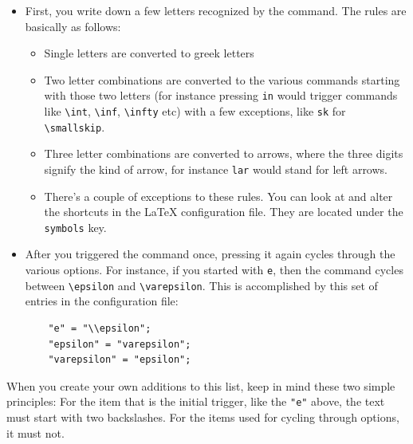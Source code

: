 \documentclass[11pt, x11names]{article}
\begin{document}
\begin{itemize}

    \item First, you write down a few letters recognized by the command. The rules are basically as follows:

    \begin{itemize}

        \item Single letters are converted to greek letters

        \item Two letter combinations are converted to the various commands starting with those two letters (for instance pressing \texttt{in} would trigger commands like \texttt{\textbackslash{}int}, \texttt{\textbackslash{}inf}, \texttt{\textbackslash{}infty} etc) with a few exceptions, like \texttt{sk} for \texttt{\textbackslash{}smallskip}.

        \item Three letter combinations are converted to arrows, where the three digits signify the kind of arrow, for instance \texttt{lar} would stand for left arrows.

        \item There's a couple of exceptions to these rules. You can look at and alter the shortcuts in the LaTeX configuration file. They are located under the \texttt{symbols} key.

    \end{itemize}

    \item After you triggered the command once, pressing it again cycles through the various options. For instance, if you started with \texttt{e}, then the command cycles between \texttt{\textbackslash{}epsilon} and \texttt{\textbackslash{}varepsilon}. This is accomplished by this set of entries in the configuration file:

    \begin{verbatim}
    "e" = "\\epsilon";
    "epsilon" = "varepsilon";
    "varepsilon" = "epsilon";
    \end{verbatim}
\end{itemize}

When you create your own additions to this list, keep in mind these two simple principles: For the item that is the initial trigger, like the \texttt{"e"} above, the text must start with two backslashes. For the items used for cycling through options, it must not.
\end{document}
